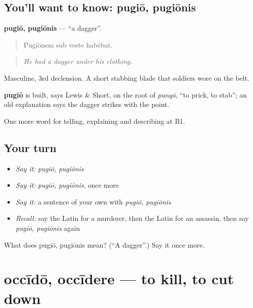 \subsection*{You'll want to know: pugiō, pugiōnis}
\textbf{pugiō, pugiōnis} — \textquotedblleft{}a dagger\textquotedblright{}.

\begin{quote}
Pugiōnem sub veste habēbat.
\end{quote}

\begin{quote}
\emph{He had a dagger under his clothing.}
\end{quote}

Masculine, 3rd declension. A short stabbing blade that soldiers wore on the belt.

\begin{cousinweb}
\textbf{pugiō} is built, says Lewis \& Short, on the root of \emph{pungō}, \textquotedblleft{}to prick, to stab\textquotedblright{}; an old explanation says the dagger strikes with the point.
\end{cousinweb}

\begin{grammarlens}[title={What you've built}]
One more word for telling, explaining and describing at B1.
\end{grammarlens}

\subsection*{Your turn}
\begin{itemize}
\raggedright
  \item \emph{Say it:} \emph{pugiō, pugiōnis}
  \item \emph{Say it:} \emph{pugiō, pugiōnis}, once more
  \item \emph{Say it:} a sentence of your own with \emph{pugiō, pugiōnis}
  \item \emph{Recall:} say the Latin for a murderer, then the Latin for an assassin, then say \emph{pugiō, pugiōnis} again
\end{itemize}

\begin{tcolorbox}[breakable,colback=teal!4,colframe=teal!35!black,title={Before you move on}]
What does pugiō, pugiōnis mean? (\textquotedblleft{}A dagger\textquotedblright{}.) Say it once more.
\end{tcolorbox}
\section[occīdō, occīdere]{occīdō, occīdere — to kill, to cut down}

